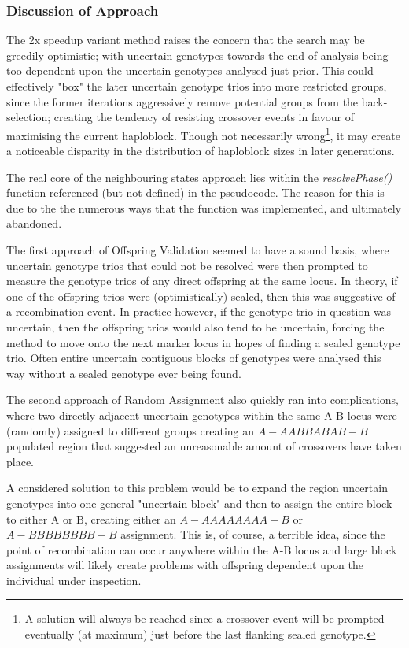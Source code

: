 \subsubsection{Discussion of Approach}

The 2x speedup variant method raises the concern that the search may be greedily optimistic; with uncertain genotypes towards the end of analysis being too dependent upon the uncertain genotypes analysed just prior. This could effectively "box" the later uncertain genotype trios into more restricted groups, since the former iterations aggressively remove potential groups from the back-selection; creating the tendency of resisting crossover events in favour of maximising the current haploblock. Though not necessarily wrong\footnote{A solution will always be reached since a crossover event will be prompted eventually (at maximum) just before the last flanking sealed genotype.}, it may create a noticeable disparity in the distribution of haploblock sizes in later generations.

The real core of the neighbouring states approach lies within the \textit{resolvePhase()} function referenced (but not defined) in the pseudocode. The reason for this is due to the the numerous ways that the function was implemented, and ultimately abandoned.

The first approach of Offspring Validation seemed to have a sound basis, where uncertain genotype trios that could not be resolved were then prompted to measure the genotype trios of any direct offspring at the same locus. In theory, if one of the offspring trios were (optimistically) sealed, then this was suggestive of a recombination event. In practice however, if the genotype trio in question was uncertain, then the offspring trios would also tend to be uncertain, forcing the method to move onto the next marker locus in hopes of finding a sealed genotype trio. Often entire uncertain contiguous blocks of genotypes were analysed this way without a sealed genotype ever being found.

The second approach of Random Assignment also quickly ran into complications, where two directly adjacent uncertain genotypes within the same A-B locus were (randomly) assigned to different groups creating an $A-AABBABAB-B$ populated region that suggested an unreasonable amount of crossovers have taken place.

A considered solution to this problem would be to expand the region uncertain genotypes into one general "uncertain block" and then to assign the entire block to either A or B, creating either an $A-AAAAAAAA-B$ or $A-BBBBBBBB-B$ assignment. This is, of course, a terrible idea, since the point of recombination can occur anywhere within the A-B locus and large block assignments will likely create problems with offspring dependent upon the individual under inspection.

